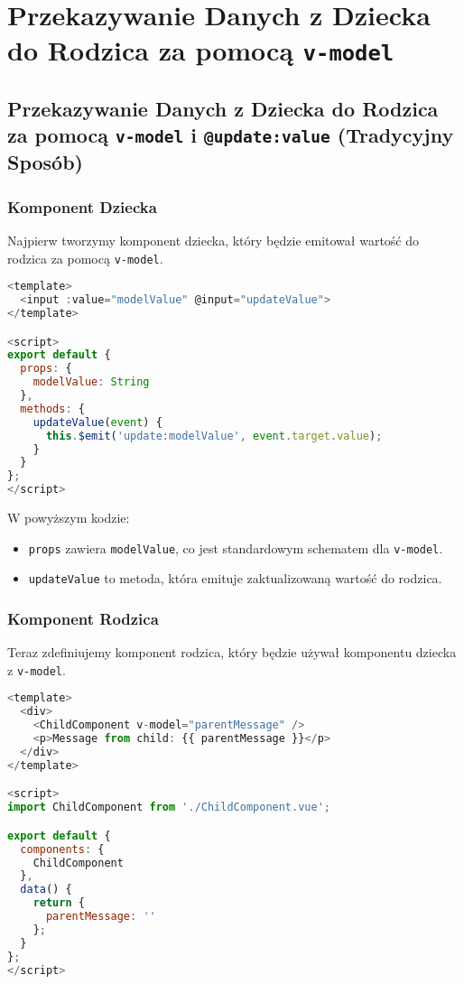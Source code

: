 \documentclass[a4paper,12pt]{article}
\begin{document}
\section{Przekazywanie Danych z Dziecka do Rodzica za pomocą \texttt{v-model}}

\subsection{Przekazywanie Danych z Dziecka do Rodzica za pomocą \texttt{v-model} i \texttt{@update:value} (Tradycyjny Sposób)}

\subsubsection{Komponent Dziecka}
Najpierw tworzymy komponent dziecka, który będzie emitował wartość do rodzica za pomocą \texttt{v-model}.

\begin{lstlisting}[language=JavaScript]
<template>
  <input :value="modelValue" @input="updateValue">
</template>

<script>
export default {
  props: {
    modelValue: String
  },
  methods: {
    updateValue(event) {
      this.$emit('update:modelValue', event.target.value);
    }
  }
};
</script>
\end{lstlisting}

W powyższym kodzie:
\begin{itemize}
  \item \texttt{props} zawiera \texttt{modelValue}, co jest standardowym schematem dla \texttt{v-model}.
  \item \texttt{updateValue} to metoda, która emituje zaktualizowaną wartość do rodzica.
\end{itemize}

\subsubsection{Komponent Rodzica}
Teraz zdefiniujemy komponent rodzica, który będzie używał komponentu dziecka z \texttt{v-model}.

\begin{lstlisting}[language=JavaScript]
<template>
  <div>
    <ChildComponent v-model="parentMessage" />
    <p>Message from child: {{ parentMessage }}</p>
  </div>
</template>

<script>
import ChildComponent from './ChildComponent.vue';

export default {
  components: {
    ChildComponent
  },
  data() {
    return {
      parentMessage: ''
    };
  }
};
</script>
\end{lstlisting}
\end{document}
